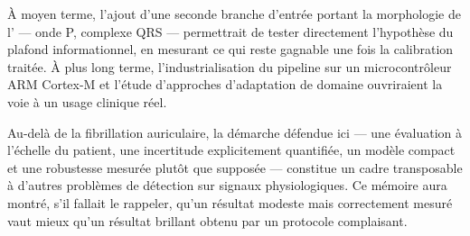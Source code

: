 À moyen terme, l'ajout d'une seconde branche d'entrée portant la morphologie de l'\ECG{} — onde P, complexe QRS — permettrait de tester directement l'hypothèse du plafond informationnel, en mesurant ce qui reste gagnable une fois la calibration traitée. À plus long terme, l'industrialisation du pipeline sur un microcontrôleur ARM Cortex-M et l'étude d'approches d'adaptation de domaine ouvriraient la voie à un usage clinique réel.

Au-delà de la fibrillation auriculaire, la démarche défendue ici — une évaluation à l'échelle du patient, une incertitude explicitement quantifiée, un modèle compact et une robustesse mesurée plutôt que supposée — constitue un cadre transposable à d'autres problèmes de détection sur signaux physiologiques. Ce mémoire aura montré, s'il fallait le rappeler, qu'un résultat modeste mais correctement mesuré vaut mieux qu'un résultat brillant obtenu par un protocole complaisant.
